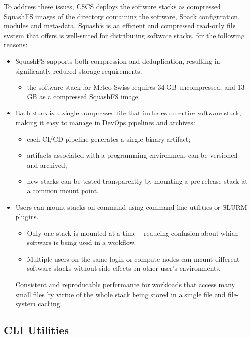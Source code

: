 To address these issues, CSCS deploys the software stacks as compressed SquashFS images of the directory containing the software, Spack configuration, modules and meta-data.
Squashfs is an efficient and compressed read-only file system that offers is well-suited for distributing software stacks, for the following reasons:
\begin{itemize}
    \item SquashFS supports both compression and deduplication, resulting in significantly reduced storage requirements.
    \begin{itemize}
        \item the software stack for Meteo Swiss requires 34 GB uncompressed, and 13 GB as a compressed SquashFS image.
    \end{itemize}

    \item Each stack is a single compressed file that includes an entire software stack, making it easy to manage in DevOps pipelines and archives:
    \begin{itemize}
        \item each CI/CD pipeline generates a single binary artifact;
        \item artifacts associated with a programming environment can be versioned and archived;
        \item new stacks can be tested transparently by mounting a pre-release stack at a common mount point.
    \end{itemize}
    \item Users can mount stacks on command using command line utilities or SLURM plugins.
    \begin{itemize}
        \item Only one stack is mounted at a time -- reducing confusion about which software is being used in a workflow.
        \item Multiple users on the same login or compute nodes can mount different software stacks without side-effects on other user's environments.
    \end{itemize}
    Consistent and reproducable performance for workloads that access many small files by virtue of the whole stack being stored in a single file and file-system caching.
\end{itemize}

\subsection{CLI Utilities}

